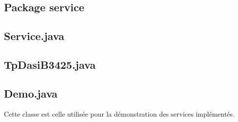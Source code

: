 \documentclass[11pt]{article}
\begin{document}
\subsection{Package service} 

\subsection*{Service.java}

\newpage

\subsection*{TpDasiB3425.java}

\newpage

\subsection*{Demo.java}
Cette classe est celle utilisée pour la démonstration des services implémentés.

\newpage
\end{document}
